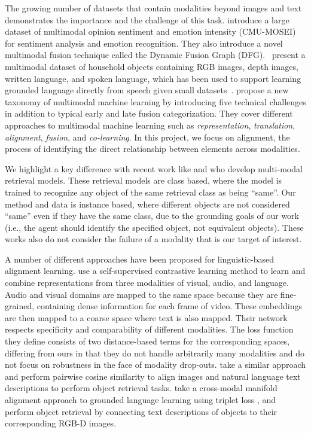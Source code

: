 \documentclass[sigconf,natbib=true,anonymous=true]{acmart}
\begin{document}
The growing number of datasets that contain modalities beyond images and text demonstrates the importance and the challenge of this task. \citet{bagher-zadeh-etal-2018-multimodal} introduce a large dataset of multimodal opinion sentiment and emotion intensity (CMU-MOSEI) for sentiment analysis and emotion recognition. They also introduce a novel multimodal fusion technique called the Dynamic Fusion Graph (DFG).~\citet{GoLD_UMBC} present a multimodal dataset of household objects containing RGB images, depth images, written language, and spoken language, which has been used to support learning grounded language directly from speech given small datasets~\cite{KebeAAAI2022}. 
\citet{baltrusaitisMultimodalMachineLearning2019} propose a new taxonomy of multimodal machine learning by introducing five technical challenges in addition to typical early and late fusion categorization. They cover different approaches to multimodal machine learning such as \textit{representation}, \textit{translation}, \textit{alignment}, \textit{fusion}, and \textit{co-learning}. In this project, we focus on alignment, the process of identifying the direct relationship between elements across modalities.

We highlight a key difference with recent work like \citet{10.1145/3397271.3401232} and \citet{10.1145/3331184.3331213} who develop multi-modal retrieval models. These retrieval models are class based, where the model is trained to recognize any object of the same retrieval class as being ``same''. Our method and data is instance based, where different objects are not considered ``same'' even if they have the same class, due to the grounding goals of our work (i.e., the agent should identify the specified object, not equivalent objects). These works also do not consider the failure of a modality that is our target of interest. 

A number of different approaches have been proposed for linguistic-based alignment learning. \citet{alayrac2020self} use a self-supervised contrastive learning method to learn and combine representations from three modalities of visual, audio, and language. Audio and visual domains are mapped to the same space because they are fine-grained, containing dense information for each frame of video. These embeddings are then mapped to a coarse space where text is also mapped. Their network respects specificity and comparability of different modalities. The loss function they define consists of two distance-based terms for the corresponding spaces, differing from ours in that they do not handle arbitrarily many modalities and do not focus on robustness in the face of modality drop-outs. \citet{Nguyen-RSS-20} take a similar approach and perform pairwise cosine similarity to align images and natural language text descriptions to perform object retrieval tasks. \citet{triplet_loss_2021_CVPR} take a cross-modal manifold alignment approach to grounded language learning using triplet loss \cite{Chechik:2010:LSO:1756006.1756042}, and perform object retrieval by connecting text descriptions of objects to their corresponding RGB-D images.
\end{document}
